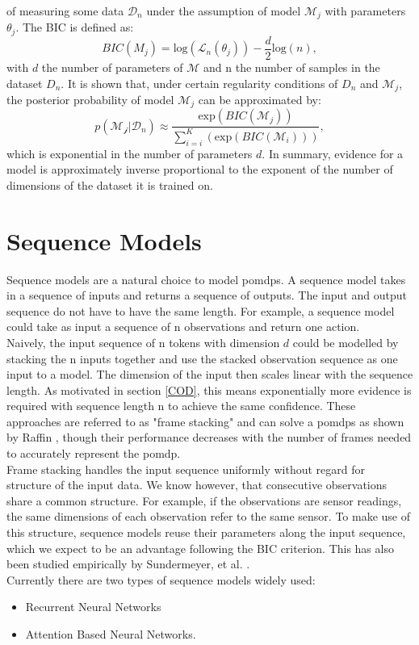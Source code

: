 of measuring some data $\mathcal{D}_n$ under the assumption of model $\mathcal{M}_j$ with parameters $\theta_j$. The BIC is defined as:
\begin{equation}
    BIC(M_j) = \text{log}(\mathcal{L}_n(\theta_j)) - \frac{d}{2} \text{log}(n),
\end{equation}
with $d$ the number of parameters of $\mathcal{M}$ and n the number of samples in the dataset $D_n$.
It is shown that, under certain regularity conditions of $D_n$ and $\mathcal{M}_j$, the posterior probability of model $\mathcal{M}_j$ can be approximated by:
\begin{equation}
    p(\mathcal{M_j}|\mathcal{D}_n) \approx \frac{\text{exp}(BIC(\mathcal{M}_j))}{\sum_{i=i}^K(\text{exp}(BIC(\mathcal{M}_i)))},
\end{equation}
which is exponential in the number of parameters $d$.
In summary, evidence for a model is approximately inverse proportional to the exponent of the number of dimensions of the dataset it is trained on.

\section{Sequence Models}
Sequence models are a natural choice to model \ac{pomdp}s. 
A sequence model takes in a sequence of inputs and returns a sequence of outputs. The input and output sequence do not have to have the same length. For example, 
a sequence model could take as input a sequence of n observations and return one action. \\ 
Naively, the input sequence of n tokens with dimension $d$ could be modelled  by stacking the n inputs together and use the stacked observation sequence as one 
input to a model. The dimension of the input then scales linear with the sequence length. As motivated in section \ref{COD}, this means exponentially more evidence is 
required with sequence length n to achieve the same confidence. These approaches are referred to as "frame stacking" and can solve a \ac{pomdp}s as shown by Raffin 
\cite{framestacking}, though 
their performance decreases with the number of frames needed to accurately represent the \ac{pomdp}. \\
Frame stacking handles the input sequence uniformly without regard for structure of the input data. We know however, that consecutive observations share a common 
structure. For example, if the observations are sensor readings, the same dimensions of each observation refer to the same sensor. To make use of this structure, 
sequence models reuse their parameters along the input sequence, which we expect to be an advantage following the BIC criterion. This has also been studied empirically 
by Sundermeyer, et al. \cite{6639310}.\\
Currently there are two types of sequence models widely used:
\begin{itemize}
    \item Recurrent Neural Networks
    \item Attention Based Neural Networks.
\end{itemize}

